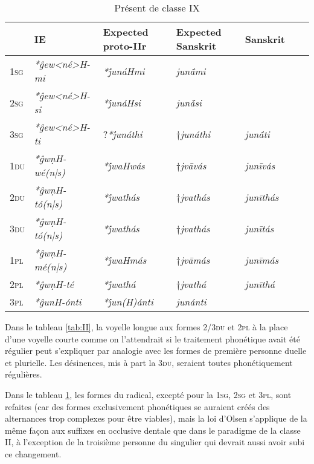 \documentclass[oldfontcommands,oneside,a4paper,11pt]{article}
\newcommand{\ipa}[1]{{\phon\textit{#1}}} %
\newcommand{\grise}[1]{\cellcolor{lightgray}\textbf{#1}}
\begin{document}
\begin{table}[H]
\caption{Présent de classe IX} \label{tab:IX}
\begin{tabular}{lllllll}
\toprule
 & 	IE  & 	Expected proto-IIr & 	Expected Sanskrit & 	Sanskrit   	\\
\midrule
\textsc{1sg} & 	\ipa{*ĝew<né>H-mi} & 	\ipa{*j́unáHmi} & 	\ipa{junā́mi} & 	  & 	\\
\textsc{2sg} & 	\ipa{*ĝew<né>H-si} & 	\ipa{*j́unáHsi} & 	\ipa{junā́si} & 	 & 	\\
\textsc{3sg} & 	\ipa{*ĝew<né>H-ti} & 	?\ipa{*j́unáthi} \grise{}& 	$\dagger$\ipa{junáthi} \grise{}& \ipa{junā́ti}  & 	\\
\textsc{1du} & 	\ipa{*ĝwṇH-wé(n|s)}   & 	\ipa{*j́waHwás} \grise{} &$\dagger$\ipa{jvāvás}\grise{}& 	 \ipa{junīvás}    	   & 	\\
\textsc{2du} & 	\ipa{*ĝwṇH-tó(n|s)} & 	\ipa{*j́wathás} \grise{}& 	$\dagger$\ipa{jvathás} \grise{}& 	\ipa{junīthás} & 	\\
\textsc{3du} & 	\ipa{*ĝwṇH-tó(n|s)} & 	\ipa{*j́wathás}  \grise{} & $\dagger$\ipa{jvathás} \grise{} & 	\ipa{junītás} & 	\\
\textsc{1pl} & 	\ipa{*ĝwṇH-mé(n|s)} & 	\ipa{*j́waHmás}  \grise{}& 	$\dagger$\ipa{jvāmás} \grise{} & 	   	\ipa{junīmás} \\
\textsc{2pl} & 	\ipa{*ĝwṇH-té} & 	\ipa{*j́wathá}  \grise{}& 	$\dagger$\ipa{jvathá}  \grise{}& 	\ipa{junīthá} &  	\\
\textsc{3pl} & 	\ipa{*ĝunH-ónti} & 	\ipa{*j́un(H)ánti} & 	\ipa{junánti} &  & 	\\
\bottomrule
\end{tabular}
\end{table}


Dans le tableau \ref{tab:II}, la voyelle longue aux formes \textsc{2/3du} et \textsc{2pl} à la place d'une voyelle courte comme on l'attendrait si le traitement phonétique avait été régulier peut s'expliquer par analogie avec les formes de première personne duelle et plurielle. Les désinences, mis à part la \textsc{3du}, seraient toutes phonétiquement régulières.

Dans le tableau \ref{tab:IX}, les formes du radical, excepté pour la \textsc{1sg}, \textsc{2sg} et \textsc{3pl}, sont refaites (car des formes exclusivement phonétiques se auraient créés des alternances trop complexes pour être viables), mais la loi d'Olsen s'applique de la même façon aux suffixes en occlusive dentale que dans le paradigme de la classe II, à l'exception de la troisième personne du singulier qui devrait aussi avoir subi ce changement.
\end{document}
